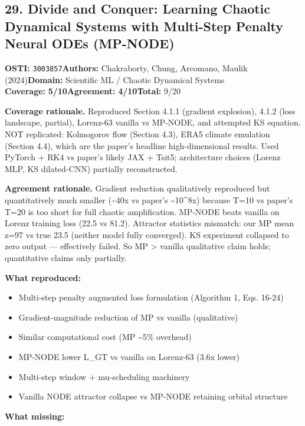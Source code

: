 \documentclass[11pt]{article}
\newcommand{\scorebadge}[2]{\textbf{#1:} \textbf{#2/10}}
\begin{document}
\subsection{29. Divide and Conquer: Learning Chaotic Dynamical Systems with Multi-Step Penalty Neural ODEs (MP-NODE)}
\textbf{OSTI:} \texttt{3003857}\quad\textbf{Authors:} Chakraborty, Chung, Arcomano, Maulik (2024)\quad\textbf{Domain:} Scientific ML / Chaotic Dynamical Systems\\
\scorebadge{Coverage}{5}\quad\scorebadge{Agreement}{4}\quad\textbf{Total:} 9/20\par\smallskip
\noindent\textbf{Coverage rationale.} Reproduced Section 4.1.1 (gradient explosion), 4.1.2 (loss landscape, partial), Lorenz-63 vanilla vs MP-NODE, and attempted KS equation. NOT replicated: Kolmogorov flow (Section 4.3), ERA5 climate emulation (Section 4.4), which are the paper's headline high-dimensional results. Used PyTorch + RK4 vs paper's likely JAX + Tsit5; architecture choices (Lorenz MLP, KS dilated-CNN) partially reconstructed.\par
\noindent\textbf{Agreement rationale.} Gradient reduction qualitatively reproduced but quantitatively much smaller (\textasciitilde{}40x vs paper's \textasciitilde{}10\textasciicircum{}8x) because T=10 vs paper's T=20 is too short for full chaotic amplification. MP-NODE beats vanilla on Lorenz training loss (22.5 vs 81.2). Attractor statistics mismatch: our MP mean z=97 vs true 23.5 (neither model fully converged). KS experiment collapsed to zero output --- effectively failed. So MP \textgreater{} vanilla qualitative claim holds; quantitative claims only partially.\par\smallskip
\noindent\textbf{What reproduced:}
\begin{itemize}[leftmargin=1.4em,itemsep=0.2em,topsep=0.2em]
\item Multi-step penalty augmented loss formulation (Algorithm 1, Eqs. 16-24)
\item Gradient-magnitude reduction of MP vs vanilla (qualitative)
\item Similar computational cost (MP \textasciitilde{}5\% overhead)
\item MP-NODE lower L\_GT vs vanilla on Lorenz-63 (3.6x lower)
\item Multi-step window + mu-scheduling machinery
\item Vanilla NODE attractor collapse vs MP-NODE retaining orbital structure
\end{itemize}\noindent\textbf{What missing:}
\end{document}
